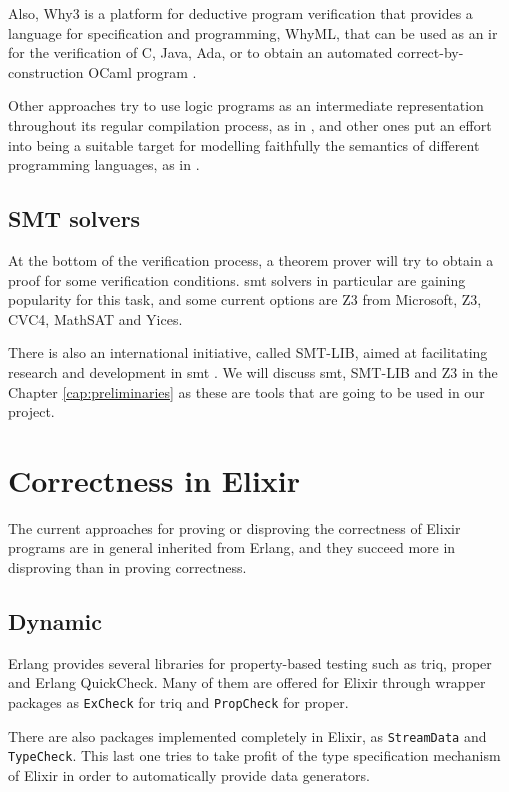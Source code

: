 Also, Why3 is a platform for deductive program verification that provides a
language for specification and programming, WhyML, that can be used as an
\gls{ir} for the verification of C, Java, Ada, or to obtain an automated
correct-by-construction OCaml program \citep{Why3Manual}.

Other approaches try to use logic programs as an intermediate representation 
throughout its regular compilation process, as in \cite{horn}, and other ones
put an effort into being a suitable target for modelling faithfully the
semantics of different programming languages, as in \cite{caviart}.

\subsection{SMT solvers}

At the bottom of the verification process, a theorem prover will try to obtain a
proof for some verification conditions. \acrshort{smt} solvers in particular are
gaining popularity for this task, and some current options are Z3 from
Microsoft, Z3, CVC4, MathSAT and Yices. 

There is also an international initiative, called SMT-LIB, aimed at facilitating
research and development in \gls{smt} \citep{smtLibStandard}. We will discuss 
\gls{smt}, SMT-LIB and Z3 in the Chapter \ref{cap:preliminaries} as these are
tools that are going to be used in our project.

\section{Correctness in Elixir}

The current approaches for proving or disproving the correctness of Elixir 
programs are in general inherited from Erlang, and they succeed more in 
disproving than in proving correctness.

\subsection{Dynamic}

Erlang provides several libraries for property-based testing such as \gls{triq},
\gls{proper} and Erlang QuickCheck. Many of them are offered for Elixir through
wrapper packages as \verb|ExCheck| for \gls{triq} and \verb|PropCheck| for
\gls{proper}.

There are also packages implemented completely in Elixir, as \verb|StreamData|
and \verb|TypeCheck|. This last one tries to take profit of the type
specification mechanism of Elixir in order to automatically provide data
generators.

